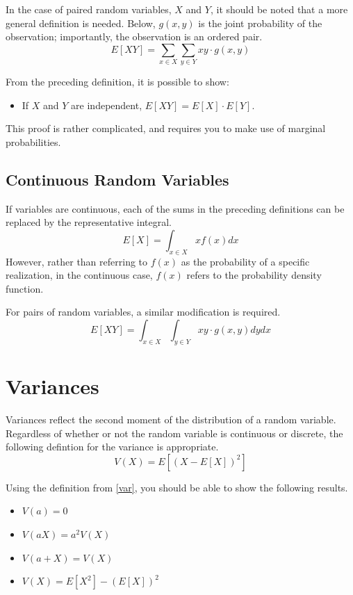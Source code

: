 \documentclass[]{amsart}
\begin{document}
In the case of paired random variables, $X$ and $Y$, it should be
noted that a more general definition is needed.  Below, $g(x,y)$ is
the joint probability of the observation; importantly, the observation
is an ordered pair.
\begin{equation}
E[XY]=\sum_{x\in X} \sum_{y \in Y} xy \cdot g(x,y)
\end{equation}

From the preceding definition, it is possible to show:
\begin{itemize}
\item If $X$ and $Y$ are independent, $E[XY]=E[X]\cdot E[Y]$.
\end{itemize}
This proof is rather complicated, and requires you to make use of
marginal probabilities.

\subsection{Continuous Random Variables}
If variables are continuous, each of the sums in the preceding
definitions can be replaced by the representative integral. 
\begin{equation}\label{contexp}
E[X]=\int_{x \in X} x f(x) dx
\end{equation}
However, rather than referring to $f(x)$ as the probability of a
specific realization, in the continuous case, $f(x)$ refers to the
probability density function.

For pairs of random variables, a similar modification is required.
\begin{equation}
E[XY]=\int_{x\in X} \int_{y \in Y} xy \cdot g(x,y) dydx
\end{equation}

\section{Variances}
Variances reflect the second moment of the distribution of a random
variable. Regardless of whether or not the random variable is
continuous or discrete, the following defintion for the variance is
appropriate. 
\begin{equation}
\label{var}
V(X) = E\left[(X-E[X])^2\right]
\end{equation}

Using the definition from \eqref{var}, you should be able to show the
following results.
\begin{itemize}
\item $V(a) = 0$
\item $V(aX)=a^2V(X)$
\item $V(a+X) = V(X)$
\item $V(X)=E\left[X^2\right]-(E[X])^2$
\end{itemize}
\end{document}
